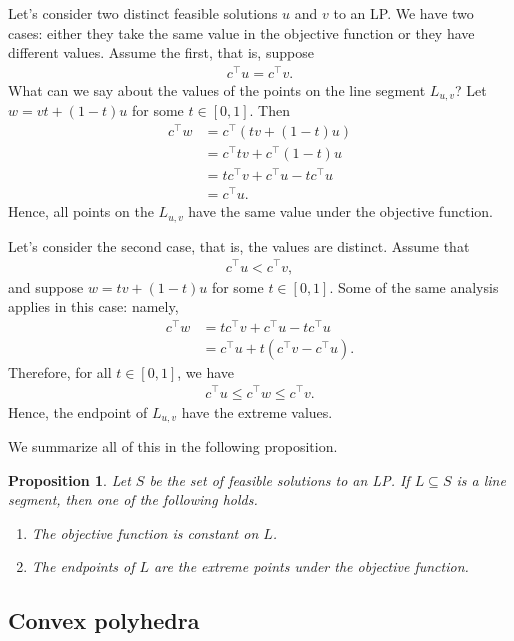 \documentclass[a4paper, 12pt]{article}
\numberwithin{equation}{section}
\numberwithin{figure}{section}
\newtheorem{prop}[thm]{Proposition}
\theoremstyle{definition}
\renewcommand{\leq}{\leqslant}
\begin{document}
Let's consider two distinct feasible solutions $u$ and $v$ to an LP. We have two
cases: either they take the same value in the objective function or they have
different values. Assume the first, that is, suppose 
\begin{align*}
	c^{\top}u = c^{\top}v.
\end{align*}
What can we say about the values of the points on the line segment $L_{u,v}$?
Let $w = vt + (1 - t)u$ for some $t\in [0, 1]$. Then 
\begin{align*}
	c^{\top}w &= c^{\top}(tv + (1 - t)u) \\
	&= c^{\top}tv + c^{\top}(1-t)u \\
	&= tc^{\top}v + c^{\top}u - tc^{\top}u \\
	&= c^{\top}u.
\end{align*}
Hence, all points on the $L_{u,v}$ have the same value under the objective
function. 

Let's consider the second case, that is, the values are distinct. Assume that 
\begin{align*}
	c^{\top} u < c^{\top}v,
\end{align*}
and suppose $w = tv + (1-t)u$ for some $t\in [0,1]$. Some of the same analysis applies in this case: namely, 
\begin{align*}
	c^{\top}w &= tc^{\top}v + c^{\top}u - tc^{\top}u \\
	&= c^{\top}u + t(c^{\top}v - c^{\top}u).
\end{align*}
Therefore, for all $t\in [0,1]$, we have 
\begin{align*}
	c^{\top}u \leq c^{\top}w \leq c^{\top}v.
\end{align*}
Hence, the endpoint of $L_{u,v}$ have the extreme values. 

We summarize all of this in the following proposition. 

\begin{prop}
	Let $S$ be the set of feasible solutions to an LP. If $L\subseteq S$ is a
	line segment, then one of the following holds.
	\begin{enumerate}
		\item The objective function is constant on $L$.
		\item The endpoints of $L$ are the extreme points under the objective
		function. 
	\end{enumerate}
\end{prop}

\subsection{Convex polyhedra}
\end{document}
